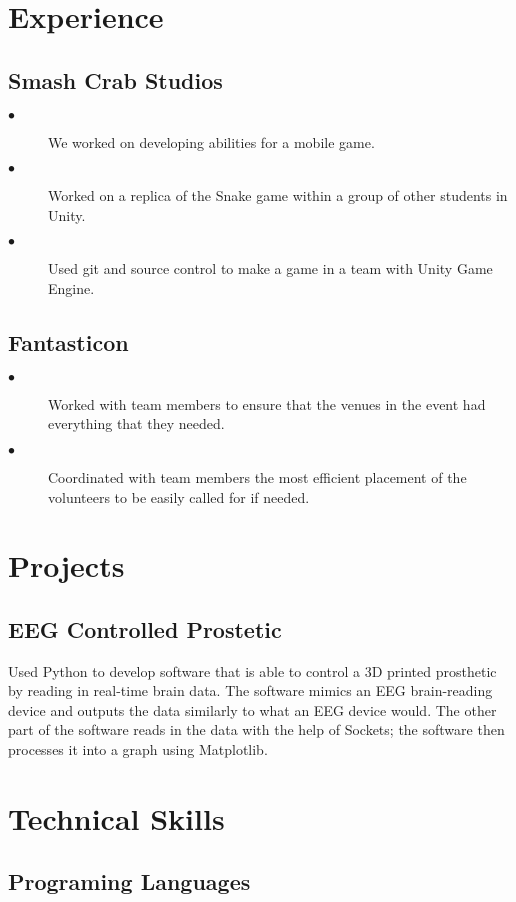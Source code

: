 \documentclass{article}
\begin{document}
\begin{multicols}{2}
    \section{Experience}
        \subsection{Smash Crab Studios}
        \begin{description}
            \item[$\bullet$]We worked on developing abilities for a mobile game.
            \item[$\bullet$]Worked on a replica of the Snake game within a group of other students in Unity. 
            \item[$\bullet$]Used git and source control to make a game in a team with Unity Game Engine.
        \end{description}
        \subsection{Fantasticon}
        \begin{description}
            \item[$\bullet$]Worked with team members to ensure that the venues in the event had everything that they needed.
            \item[$\bullet$]Coordinated with team members the most efficient placement of the volunteers to be easily called for if needed.
        \end{description}
    \columnbreak
    \section{Projects}
    \subsection{EEG Controlled Prostetic}
    Used Python to develop software that is able to control a 3D printed prosthetic 
    by reading in real-time brain data. The software mimics an EEG brain-reading device 
    and outputs the data similarly to what an EEG device would. 
    The other part of the software reads in the data with the help of Sockets; 
    the software then processes it into a graph using Matplotlib. 
    \section{Technical Skills}
        \subsection{Programing Languages}

\end{multicols}
\end{document}
